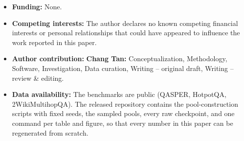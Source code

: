 \documentclass[pdflatex,sn-basic]{sn-jnl}
\theoremstyle{remark}
\begin{document}
\begin{itemize}
\item \textbf{Funding:} None.

\item \textbf{Competing interests:} The author declares no known
competing financial interests or personal relationships that could have
appeared to influence the work reported in this paper.

\item \textbf{Author contribution:} \textbf{Chang Tan:}
Conceptualization, Methodology, Software, Investigation, Data curation,
Writing -- original draft, Writing -- review \& editing.

\item \textbf{Data availability:} The benchmarks are public (QASPER,
HotpotQA, 2WikiMultihopQA). The released repository contains the
pool-construction scripts with fixed seeds, the sampled pools, every
raw checkpoint, and one command per table and figure, so that every
number in this paper can be regenerated from scratch.
\end{itemize}
\end{document}
